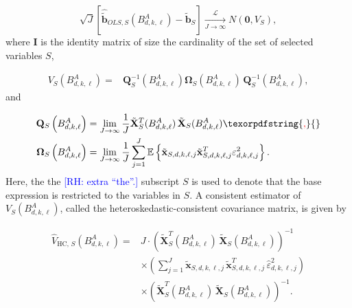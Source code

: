 \documentclass[10pt,a4paper,oneside]{article}
\newcommand{\E}{\mathbb{E}}
\newcommand{\rh}[1]{\textcolor{blue}{\textsf{[RH: #1]}}}
\providecommand{\DIFdeltex}[1]{{\protect\color{red} \scriptsize #1}} %
\providecommand{\DIFdelbegin}{} %
\providecommand{\DIFdelend}{} %
\providecommand{\DIFdel}[1]{\texorpdfstring{\DIFdeltex{#1}}{}} %
\newcommand{\DIFscaledelfig}{0.5}
\newlength{\DIFdelgraphicswidth} %
\newlength{\DIFdelgraphicsheight} %
\newcommand{\DIFdelincludegraphics}[2][]{%
\sbox{\DIFdelgraphicsbox}{\DIFOincludegraphics[#1]{#2}}%
\settoboxwidth{\DIFdelgraphicswidth}{\DIFdelgraphicsbox} %
\settoboxtotalheight{\DIFdelgraphicsheight}{\DIFdelgraphicsbox} %
\scalebox{\DIFscaledelfig}{%
\parbox[b]{\DIFdelgraphicswidth}{\usebox{\DIFdelgraphicsbox}\\[-\baselineskip] \rule{\DIFdelgraphicswidth}{0em}}\llap{\resizebox{\DIFdelgraphicswidth}{\DIFdelgraphicsheight}{%
\setlength{\unitlength}{\DIFdelgraphicswidth}%
\begin{picture}(1,1)%
\thicklines\linethickness{2pt} %
{\color[rgb]{1,0,0}\put(0,0){\framebox(1,1){}}}%
{\color[rgb]{1,0,0}\put(0,0){\line( 1,1){1}}}%
{\color[rgb]{1,0,0}\put(0,1){\line(1,-1){1}}}%
\end{picture}%
}\hspace*{3pt}}} %
} %
\DeclareRobustCommand{\DIFdelbegin}{\DIFOdelbegin \let\includegraphics\DIFdelincludegraphics} %
\DeclareRobustCommand{\DIFdelend}{\DIFOaddend \let\includegraphics\DIFOincludegraphics} %
\begin{document}
$$
    \sqrt{J}\left[\hat{\tilde{\mathbf{b}}}_{OLS,S} \left( B^A_{d, k, \ell} \right) - \tilde{\mathbf{b}}_S \right]  \xrightarrow[J \rightarrow \infty]{\mathcal{L}} N(\mathbf{0}, V_S),
$$
where $\mathbf{I}$ is the identity matrix of size the cardinality of the set of selected variables $S$,

\begin{align*}
    V_{S} \left( B^A_{d, k, \ell} \right)
    ={} &
    \mathbf{Q}^{-1}_S\left(B^A_{d,k,\ell}\right)\mathbf{\Omega}_S\left(B^A_{d,k,\ell}\right) \, \mathbf{Q}^{-1}_S\left(B^A_{d,k,\ell}\right),
\end{align*}
and

\begin{align*}
    \mathbf{Q}_S\left(B^A_{d,k,\ell}\right)      & = \lim_{J \rightarrow \infty} \frac{1}{J}\tilde{\mathbf{X}}_{S}^T(B^A_{d,k,\ell})
    \,\tilde{\mathbf{X}}_{S}(B^A_{d,k,\ell})                                                                                                                                                                                          \DIFdelbegin \DIFdel{,                                                                                                                                                                                         }\DIFdelend \\
    \mathbf{\Omega}_S\left(B^A_{d,k,\ell}\right) & = \lim_{J \rightarrow \infty} \frac{1}{J} \sum^J_{j = 1} \E \left \{ \tilde{\mathbf{x}}_{S,d,k,\ell,j} \tilde{\mathbf{x}}_{S,d,k,\ell,j}^T \varepsilon^2_{d, k, \ell, j} \right\}.
\end{align*}
Here, the \DIFdelbegin \DIFdel{the \rh{extra ``the''.} }\DIFdelend subscript $S$ is used to denote that the base expression is restricted to the variables in $S$. A consistent estimator of $V_S\left( B^A_{d,k,\ell} \right)$, called the heteroskedastic-consistent covariance matrix, is given by

\begin{align*}
    \hat{V}_{\mathrm{HC},\,S} \left( B^A_{d, k, \ell} \right)
    ={} &
    J \cdot \left(\tilde{\mathbf{X}}_{S}^T(B^A_{d,k,\ell})
    \,\tilde{\mathbf{X}}_{S}(B^A_{d,k,\ell})\right)^{-1} \\
        & \times
    \left(\sum_{j=1}^J
    \tilde{\mathbf{x}}_{S,d,k,\ell,j}
    \,\tilde{\mathbf{x}}_{S,d,k,\ell,j}^T\,
    \hat{\varepsilon}^2_{d,k,\ell,j}\right)              \\
        & \times
    \left(\tilde{\mathbf{X}}_{S}^T(B^A_{d,k,\ell})
    \,\tilde{\mathbf{X}}_{S}(B^A_{d,k,\ell})\right)^{-1}.
\end{align*}
\end{document}

